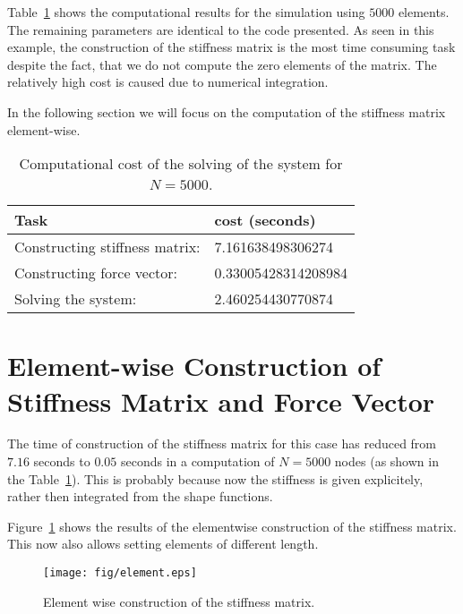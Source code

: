 \documentclass[twoside,a4paper,12pt]{article}
\newcommand{\figref}[1]{Figure~\ref{#1}}
\newcommand{\tabref}[1]{Table~\ref{#1}}
\newcommand{\+}[2]{\newcommand#1{{\color{\notcolor}#2}}}
\newcommand{\1}[2]{\newcommand{#1}[1]{{\color{\notcolor}#2}}}
\newcommand{\2}[2]{\newcommand{#1}[2]{{\color{\notcolor}#2}}}
\begin{document}
\tabref{tab:comp-cost} shows the computational results for the
simulation using $5000$ elements. The remaining parameters are
identical to the code presented. As seen in this example, the
construction of the stiffness matrix is the most time consuming task
despite the fact, that we do not compute the zero elements of the
matrix. The relatively high cost is caused due to numerical
integration.

In the following section we will focus on the computation of the
stiffness matrix element-wise.

\begin{table}
  \centering
  \label{tab:comp-cost}
\caption{Computational cost of the solving of the system for $N=5000$.}
\begin{tabular}{ll}
  \toprule
  Task & cost (seconds)\\
  \midrule
  Constructing stiffness matrix: & 7.161638498306274   \\
  Constructing force vector:     & 0.33005428314208984 \\
  Solving the system:            & 2.460254430770874   \\
  \bottomrule
\end{tabular}
\end{table}



\section{Element-wise Construction of Stiffness Matrix and Force Vector}

The time of construction of the stiffness matrix for this case has
reduced from $7.16$ seconds to $0.05$ seconds in a computation of
$N= 5000$ nodes (as shown in the \tabref{tab:comp-cost}). This is
probably because now the stiffness is given explicitely, rather then
integrated from the shape functions.

\figref{fig:element} shows the results of the elementwise construction
of the stiffness matrix. This now also allows setting elements of
different length.

\begin{figure}
  \centering
  \texttt{[image: fig/element.eps]}
  \caption{Element wise construction of the stiffness matrix.}
  \label{fig:element}
\end{figure}


\end{document}

